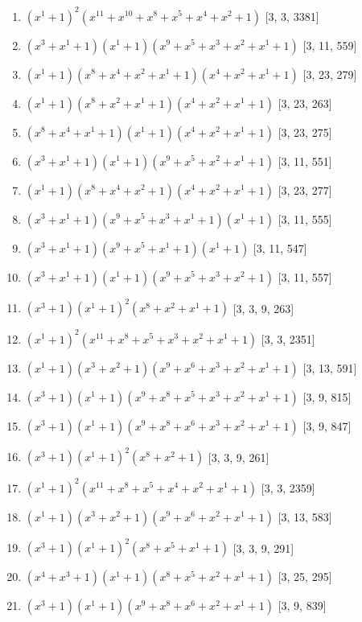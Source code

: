 \documentclass[10pt,twocolumn]{article}
\begin{document}
\begin{enumerate}
\item $(x^{1} + 1)^{2}(x^{11} + x^{10} + x^{8} + x^{5} + x^{4} + x^{2} + 1)$  [3, 3, 3381]
\item $(x^{3} + x^{1} + 1)(x^{1} + 1)(x^{9} + x^{5} + x^{3} + x^{2} + x^{1} + 1)$  [3, 11, 559]
\item $(x^{1} + 1)(x^{8} + x^{4} + x^{2} + x^{1} + 1)(x^{4} + x^{2} + x^{1} + 1)$  [3, 23, 279]
\item $(x^{1} + 1)(x^{8} + x^{2} + x^{1} + 1)(x^{4} + x^{2} + x^{1} + 1)$  [3, 23, 263]
\item $(x^{8} + x^{4} + x^{1} + 1)(x^{1} + 1)(x^{4} + x^{2} + x^{1} + 1)$  [3, 23, 275]
\item $(x^{3} + x^{1} + 1)(x^{1} + 1)(x^{9} + x^{5} + x^{2} + x^{1} + 1)$  [3, 11, 551]
\item $(x^{1} + 1)(x^{8} + x^{4} + x^{2} + 1)(x^{4} + x^{2} + x^{1} + 1)$  [3, 23, 277]
\item $(x^{3} + x^{1} + 1)(x^{9} + x^{5} + x^{3} + x^{1} + 1)(x^{1} + 1)$  [3, 11, 555]
\item $(x^{3} + x^{1} + 1)(x^{9} + x^{5} + x^{1} + 1)(x^{1} + 1)$  [3, 11, 547]
\item $(x^{3} + x^{1} + 1)(x^{1} + 1)(x^{9} + x^{5} + x^{3} + x^{2} + 1)$  [3, 11, 557]
\item $(x^{3} + 1)(x^{1} + 1)^{2}(x^{8} + x^{2} + x^{1} + 1)$  [3, 3, 9, 263]
\item $(x^{1} + 1)^{2}(x^{11} + x^{8} + x^{5} + x^{3} + x^{2} + x^{1} + 1)$  [3, 3, 2351]
\item $(x^{1} + 1)(x^{3} + x^{2} + 1)(x^{9} + x^{6} + x^{3} + x^{2} + x^{1} + 1)$  [3, 13, 591]
\item $(x^{3} + 1)(x^{1} + 1)(x^{9} + x^{8} + x^{5} + x^{3} + x^{2} + x^{1} + 1)$  [3, 9, 815]
\item $(x^{3} + 1)(x^{1} + 1)(x^{9} + x^{8} + x^{6} + x^{3} + x^{2} + x^{1} + 1)$  [3, 9, 847]
\item $(x^{3} + 1)(x^{1} + 1)^{2}(x^{8} + x^{2} + 1)$  [3, 3, 9, 261]
\item $(x^{1} + 1)^{2}(x^{11} + x^{8} + x^{5} + x^{4} + x^{2} + x^{1} + 1)$  [3, 3, 2359]
\item $(x^{1} + 1)(x^{3} + x^{2} + 1)(x^{9} + x^{6} + x^{2} + x^{1} + 1)$  [3, 13, 583]
\item $(x^{3} + 1)(x^{1} + 1)^{2}(x^{8} + x^{5} + x^{1} + 1)$  [3, 3, 9, 291]
\item $(x^{4} + x^{3} + 1)(x^{1} + 1)(x^{8} + x^{5} + x^{2} + x^{1} + 1)$  [3, 25, 295]
\item $(x^{3} + 1)(x^{1} + 1)(x^{9} + x^{8} + x^{6} + x^{2} + x^{1} + 1)$  [3, 9, 839]

\end{enumerate}
\end{document}
